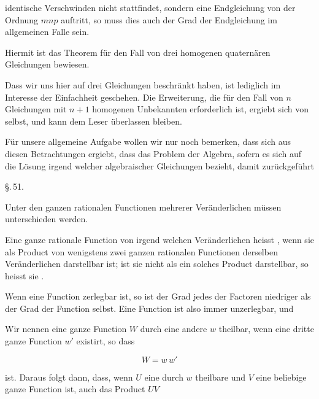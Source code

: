 identische Verschwinden nicht stattfindet, sondern eine Endgleichung von der Ordnung $mnp$ auftritt, so muss dies auch der
Grad der Endgleichung im allgemeinen Falle sein.

Hiermit ist das  Theorem für den Fall von
drei homogenen quaternären Gleichungen bewiesen.

Dass wir uns hier auf drei Gleichungen beschränkt haben,
ist lediglich im Interesse der Einfachheit geschehen. Die Erweiterung, die für den Fall von $n$ Gleichungen mit $n + 1$ homogenen Unbekannten erforderlich ist, ergiebt sich von selbst, und
kann dem Leser überlassen bleiben.

Für unsere allgemeine Aufgabe wollen wir nur noch bemerken, dass sich aus diesen Betrachtungen ergiebt, dass das
Problem der Algebra, sofern es sich auf die Lösung irgend
welcher algebraischer Gleichungen bezieht, damit zurückgeführt

\begin{center}
\S.\,51.

\end{center}

Unter den ganzen rationalen Functionen mehrerer Veränderlichen müssen  unterschieden
werden.

Eine ganze rationale Function von irgend welchen Veränderlichen heisst , wenn sie als Product von wenigstens
zwei ganzen rationalen Functionen derselben Veränderlichen darstellbar ist; ist sie nicht als ein solches Product darstellbar, so
heisst sie .

Wenn eine Function zerlegbar ist, so ist der Grad jedes
der Factoren niedriger als der Grad der Function selbst. Eine
 Function ist also immer unzerlegbar, und 

Wir nennen eine ganze Function $W$ durch eine andere $w$
theilbar, wenn eine dritte ganze Function $w'$ existirt, so dass

\[
W = w\,w'
\]

ist. Daraus folgt dann, dass, wenn $U$ eine durch $w$ theilbare
und $V$ eine beliebige ganze Function ist, auch das Product $UV$
